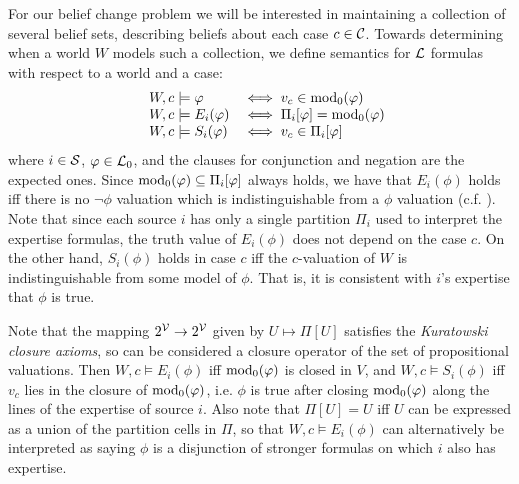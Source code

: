 For our belief change problem we will be interested in maintaining a
collection of several belief sets, describing beliefs about each case $c \in
\C$. Towards determining when a world $W$ models such a collection, we define
semantics for $\lext$ formulas with respect to a world and a case:
\[
    \begin{array}{lll}
        &W, c \models \phi &\iff v_c \in \propmods(\phi) \\
        &W, c \models E_i(\phi) &\iff \Pi_i[\phi] = \propmods(\phi) \\
        &W, c \models S_i(\phi) &\iff v_c \in \Pi_i[\phi]
    \end{array}
\]
where $i \in \S$, $\phi \in \lprop$, and the clauses for conjunction and
negation are the expected ones. Since $\propmods(\phi) \subseteq \Pi_i[\phi]$
always holds, we have that $E_i(\phi)$ holds iff there is no
$\neg\phi$ valuation which is indistinguishable from a $\phi$ valuation (c.f.
\textcite{booth_trust_2018}). Note
that since each source $i$ has only a single partition $\Pi_i$ used to
interpret the expertise formulas, the truth value of $E_i(\phi)$ does not
depend on the case $c$. On the other hand, $S_i(\phi)$ holds in case $c$ iff
the $c$-valuation of $W$ is indistinguishable from some model of $\phi$. That
is, it is consistent with $i$'s expertise that $\phi$ is true.

Note that the mapping $2^\vals \rightarrow 2^\vals$ given by $U \mapsto \Pi[U]$
satisfies the \emph{Kuratowski closure axioms},\footnotemark{} so can be
considered a closure operator of the set of propositional valuations. Then $W,
c \models E_i(\phi)$ iff $\propmods(\phi)$ is closed in $V$, and $W, c \models
S_i(\phi)$ iff $v_c$ lies in the closure of $\propmods(\phi)$, i.e. $\phi$ is
true after closing $\propmods(\phi)$ along the lines of the expertise of source
$i$. Also note that $\Pi[U] = U$ iff $U$ can be expressed as a union of the
partition cells in $\Pi$, so that $W, c \models E_i(\phi)$ can alternatively be
interpreted as saying $\phi$ is a disjunction of stronger formulas on which $i$
also has expertise.
%

